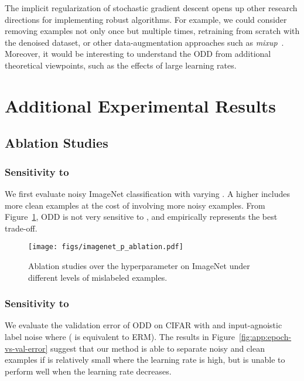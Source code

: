 \documentclass[a4paper,11pt]{article}
\begin{document}
The implicit regularization of stochastic gradient descent opens up other research directions for implementing robust algorithms. For example, we could consider removing examples not only once but multiple times, retraining from scratch with the denoised dataset, or other data-augmentation approaches such as \textit{mixup}~\cite{zhang2017mixup}. Moreover, it would be interesting to understand the \textsc{ODD} from additional theoretical viewpoints, such as the effects of large learning rates. 
\clearpage



\appendix
\newpage
\onecolumn
\appendix




\section{Additional Experimental Results}
\subsection{Ablation Studies}
\label{sec:exp-ablation}



\subsubsection{Sensitivity to } We first evaluate noisy ImageNet classification with varying . A higher  includes more clean examples at the cost of involving more noisy examples. 
From Figure~\ref{fig:app:ablation-imagenet-p}, \textsc{ODD} is not very sensitive to , and empirically  represents the best trade-off. \begin{figure}[h]
    \centering
    \texttt{[image: figs/imagenet\_p\_ablation.pdf]}
    \caption{Ablation studies over the hyperparameter  on ImageNet under different levels of mislabeled examples.}
    \label{fig:app:ablation-imagenet-p}
\end{figure}



\subsubsection{Sensitivity to } We evaluate the validation error of \textsc{ODD} on CIFAR with  and  input-agnoistic label noise where  ( is equivalent to \textsc{ERM}). The results in Figure~\ref{fig:app:epoch-vs-val-error} suggest that our method is able to separate noisy and clean examples if  is relatively small where the learning rate is high, but is unable to perform well when the learning rate decreases.
\end{document}
